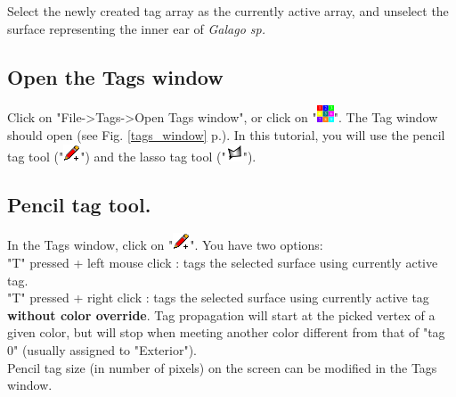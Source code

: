 \documentclass[12pt, a4paper]{book}
\begin{document}
Select the newly created tag array as the currently active array, and unselect the surface representing the inner ear of \textit{Galago sp.}


\subsection{Open the Tags window}
Click on "File->Tags->Open Tags window", or click on "\includegraphics[scale=0.7]{../images/04/tag_edit.png}". The Tag window should open (see Fig. \ref{tags_window} p.\pageref{tags_window}). In this tutorial, you will use the pencil tag tool ("\includegraphics[scale=0.7]{../images/12/pencil.png}") and the lasso tag tool ("\includegraphics[scale=0.7]{../images/12/lasso.png}"). 

\subsection{Pencil tag tool.}
In the Tags window, click on "\includegraphics[scale=0.7]{../images/12/pencil.png}".
You have two options:\\
 "T" pressed + left mouse click : tags the selected surface using currently active tag.\\
"T" pressed + right click : tags the selected surface using currently active tag \textbf{without color override}. Tag propagation will start at the picked vertex of a given color, but will stop when meeting another color different from that of "tag 0" (usually assigned to "Exterior").
\\Pencil tag size (in number of pixels) on the screen can be modified in the Tags window.
\end{document}
